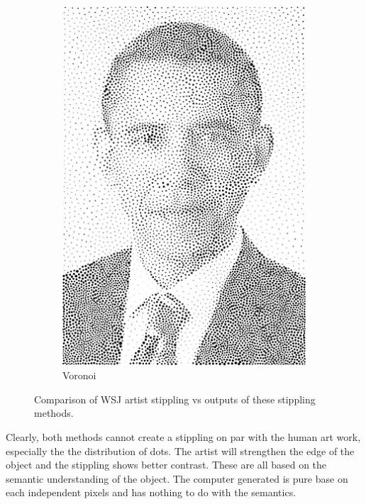 \documentclass[11pt]{article}
\begin{document}
\begin{enumerate}
\begin{figure}[H]
\begin{subfigure}{0.4\textwidth}
        \includegraphics[width=\textwidth]{../results/voronoi/5-1.pdf}
 \caption{Voronoi}
    \end{subfigure}
    \caption{Comparison of WSJ artist stippling vs outputs of these stippling methods.}
    \label{fig:art}
\end{figure}

Clearly, both methods cannot create a stippling on par with the human art work, especially the the distribution of dots. The artist will strengthen the edge of the object and the stippling shows better contrast. These are all based on the semantic understanding of the object. The computer generated is pure base on each independent pixels and has nothing to do with the semantics.

\end{enumerate}
\end{document}
